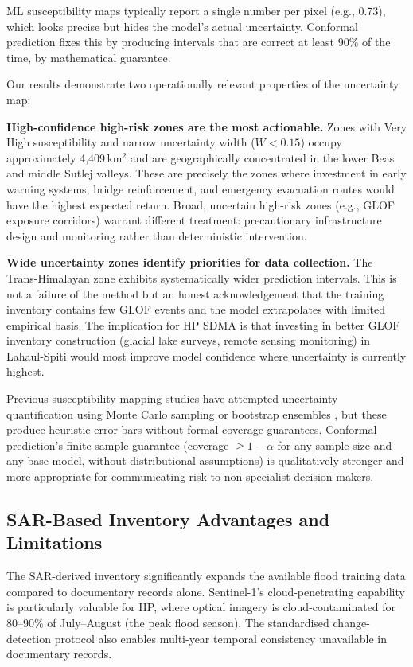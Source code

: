 ML susceptibility maps typically report a single number per pixel (e.g., 0.73),
which looks precise but hides the model's actual uncertainty.
Conformal prediction fixes this by producing intervals that are correct
at least 90\% of the time, by mathematical guarantee.

Our results demonstrate two operationally relevant properties of the uncertainty map:

\textbf{High-confidence high-risk zones are the most actionable.}
Zones with Very High susceptibility and narrow uncertainty width ($W < 0.15$)
occupy approximately 4,409\,km$^2$ and are geographically concentrated
in the lower Beas and middle Sutlej valleys.
These are precisely the zones where investment in early warning systems,
bridge reinforcement, and emergency evacuation routes would have the highest
expected return.
Broad, uncertain high-risk zones (e.g., GLOF exposure corridors)
warrant different treatment: precautionary infrastructure design
and monitoring rather than deterministic intervention.

\textbf{Wide uncertainty zones identify priorities for data collection.}
The Trans-Himalayan zone exhibits systematically wider prediction intervals.
This is not a failure of the method but an honest acknowledgement
that the training inventory contains few GLOF events and the model
extrapolates with limited empirical basis.
The implication for HP SDMA is that investing in better GLOF inventory construction
(glacial lake surveys, remote sensing monitoring) in Lahaul-Spiti
would most improve model confidence where uncertainty is currently highest.

Previous susceptibility mapping studies have attempted uncertainty quantification
using Monte Carlo sampling or bootstrap ensembles
\citep{ghosh2023karnali, kosi2025ml},
but these produce heuristic error bars without formal coverage guarantees.
Conformal prediction's finite-sample guarantee
(coverage $\geq 1-\alpha$ for any sample size and any base model,
without distributional assumptions) is qualitatively stronger
and more appropriate for communicating risk to non-specialist decision-makers.

\subsection{SAR-Based Inventory Advantages and Limitations}
\label{sec:disc_sar}

The SAR-derived inventory significantly expands the available flood training data
compared to documentary records alone.
Sentinel-1's cloud-penetrating capability is particularly valuable for HP,
where optical imagery is cloud-contaminated for 80--90\% of July--August
(the peak flood season).
The standardised change-detection protocol also enables multi-year temporal
consistency unavailable in documentary records.

